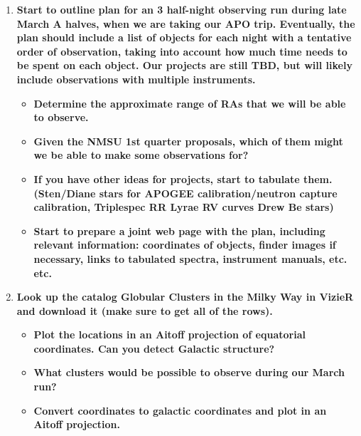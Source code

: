 \documentclass[12pt]{article}
\begin{document}
\begin{enumerate}[1.]
    \item \textbf{Start to outline plan for an 3 half-night observing
    run during late March A halves, when we are taking our APO trip.
    Eventually, the plan should include a list of objects for each
    night with a tentative order of observation, taking into account
    how much time needs to be spent on each object. Our projects are
    still TBD, but will likely include observations with multiple
    instruments.}
        \begin{itemize}
            \item \textbf{Determine the approximate range of RAs that
            we will be able to observe. }
            \item \textbf{Given the NMSU 1st quarter proposals, which
            of them might we be able to make some observations for?}
            \item \textbf{If you have other ideas for projects, start
            to tabulate them. (Sten/Diane stars for APOGEE
            calibration/neutron capture calibration, Triplespec RR
            Lyrae RV curves Drew Be stars)}
            \item \textbf{Start to prepare a joint web page with the
            plan, including relevant information: coordinates of
            objects, finder images if necessary, links to tabulated
            spectra, instrument manuals, etc. etc. }
        \end{itemize}

    \item \textbf{Look up the catalog Globular Clusters in the Milky
    Way in VizieR and download it (make sure to get all of the rows).}
        \begin{itemize}
            \item \textbf{Plot the locations in an Aitoff projection
            of equatorial coordinates. Can you detect Galactic
            structure?}
            \item \textbf{What clusters would be possible to observe
            during our March run? }
            \item \textbf{Convert coordinates to galactic coordinates
            and plot in an Aitoff projection.}
        \end{itemize}


\end{enumerate}
\end{document}
